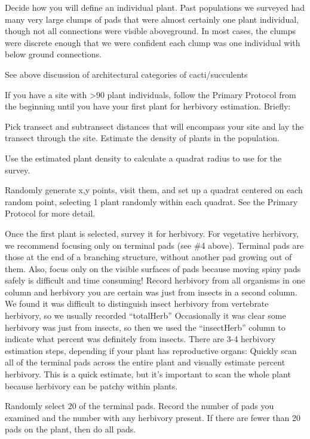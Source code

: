 \documentclass[
  letterpaper,
  oneside,
  open=any]{scrbook}
\begin{document}
Decide how you will define an individual plant. Past populations we
surveyed had many very large clumps of pads that were almost certainly
one plant individual, though not all connections were visible
aboveground. In most cases, the clumps were discrete enough that we were
confident each clump was one individual with below ground connections.

See above discussion of architectural categories of cacti/succulents

If you have a site with \textgreater90 plant individuals, follow the
Primary Protocol from the beginning until you have your first plant for
herbivory estimation. Briefly:

Pick transect and subtransect distances that will encompass your site
and lay the transect through the site. Estimate the density of plants in
the population.

Use the estimated plant density to calculate a quadrat radius to use for
the survey.

Randomly generate x,y points, visit them, and set up a quadrat centered
on each random point, selecting 1 plant randomly within each quadrat.
See the Primary Protocol for more detail.

Once the first plant is selected, survey it for herbivory. For
vegetative herbivory, we recommend focusing only on terminal pads (see
\#4 above). Terminal pads are those at the end of a branching structure,
without another pad growing out of them. Also, focus only on the visible
surfaces of pads because moving spiny pads safely is difficult and time
consuming! Record herbivory from all organisms in one column and
herbivory you are certain was just from insects in a second column. We
found it was difficult to distinguish insect herbivory from vertebrate
herbivory, so we usually recorded ``totalHerb'' Occasionally it was
clear some herbivory was just from insects, so then we used the
``insectHerb'' column to indicate what percent was definitely from
insects. There are 3-4 herbivory estimation steps, depending if your
plant has reproductive organs: Quickly scan all of the terminal pads
across the entire plant and visually estimate percent herbivory. This is
a quick estimate, but it's important to scan the whole plant because
herbivory can be patchy within plants.

Randomly select 20 of the terminal pads. Record the number of pads you
examined and the number with any herbivory present. If there are fewer
than 20 pads on the plant, then do all pads.
\end{document}
